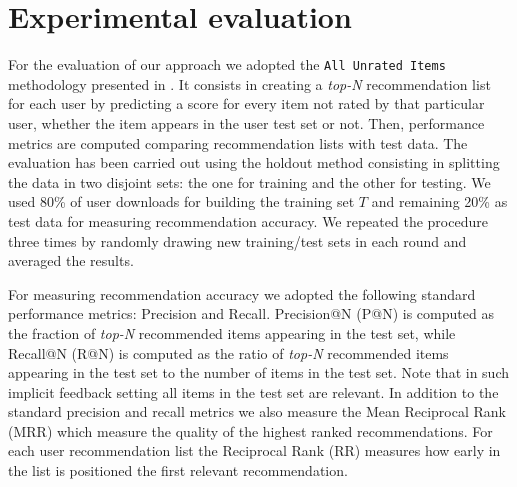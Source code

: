 \section{Experimental evaluation}
\label{sec:graph-rec:evaluation}
For the evaluation of our approach we adopted the \texttt{All Unrated Items} methodology presented in \cite{Steck13}. It consists in creating a \textit{top-N}\xspace recommendation list for each user by predicting a score for every item not rated by that particular user, whether the item appears in the user test set or not. Then, performance metrics are computed comparing recommendation lists with test data.  
The evaluation has been carried out using the holdout method consisting in splitting the data in two disjoint sets: the one for training and the other for testing. We used 80\% of user downloads for building the training set $T$ and remaining 20\% as test data for measuring recommendation accuracy. We repeated the procedure three times by randomly drawing new training/test sets in each round and averaged the results.

For measuring recommendation accuracy we adopted the following standard performance metrics: Precision and Recall. 
Precision@N (P@N) is computed as the fraction of \textit{top-N}\xspace recommended items appearing in the test set, while Recall@N (R@N) is computed as the ratio of \textit{top-N}\xspace recommended items appearing in the test set to the number of items in the test set. Note that in such implicit feedback setting all items in the test set are relevant. In addition to the standard precision and recall metrics we also measure the Mean Reciprocal Rank (MRR) which measure the quality of the highest ranked recommendations. For each user recommendation list the Reciprocal Rank (RR) measures how early in the list is positioned the first relevant recommendation. 

